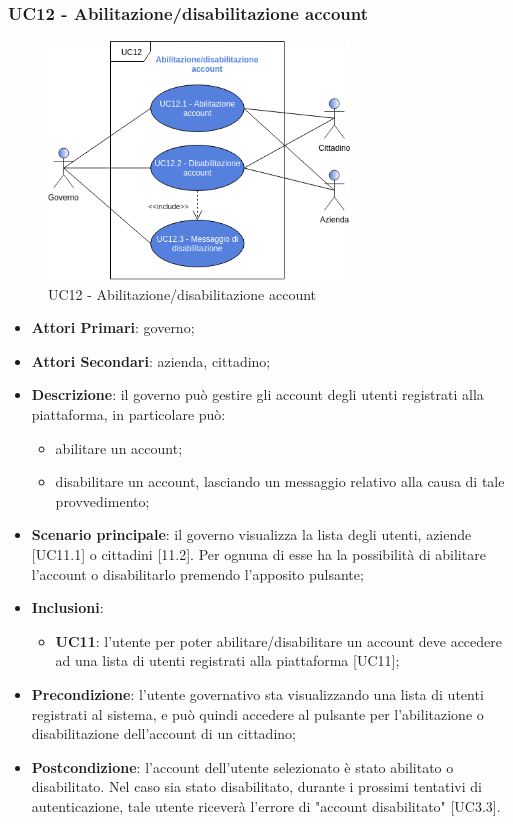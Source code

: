 \subsubsection{UC12 - Abilitazione/disabilitazione account}
\begin{figure}[h]
	\includegraphics[width=8cm]{res/images/UC12-Generale.png}
	\centering
	\caption{UC12 - Abilitazione/disabilitazione account}
\end{figure}
\begin{itemize}
	\item \textbf{Attori Primari}:
	governo;
	\item \textbf{Attori Secondari}:
	azienda, cittadino;
	\item \textbf{Descrizione}: il governo può gestire gli account degli utenti registrati alla piattaforma, in particolare può:
	\begin{itemize}
		\item abilitare un account;
		\item disabilitare un account, lasciando un messaggio relativo alla causa di tale provvedimento;
	\end{itemize}
	\item \textbf{Scenario principale}: il governo visualizza la lista degli utenti, aziende [UC11.1] o cittadini [11.2]. Per ognuna di esse ha la possibilità di abilitare l'account o disabilitarlo premendo l'apposito pulsante;
	\item \textbf{Inclusioni}: 
	\begin{itemize}
		\item \textbf{UC11}: l'utente per poter abilitare/disabilitare un account deve accedere ad una lista di utenti registrati alla piattaforma [UC11];
	\end{itemize}
	\item \textbf{Precondizione}: l'utente governativo sta visualizzando una lista di utenti registrati al sistema, e può quindi accedere al pulsante per l'abilitazione o disabilitazione dell'account di un cittadino;
	\item \textbf{Postcondizione}: l'account dell'utente selezionato è stato abilitato o disabilitato. Nel caso sia stato disabilitato, durante i prossimi tentativi di autenticazione, tale utente riceverà l'errore di "account disabilitato" [UC3.3].
\end{itemize} 

